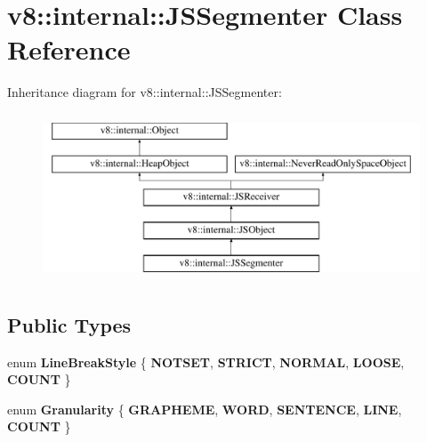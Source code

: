 \hypertarget{classv8_1_1internal_1_1JSSegmenter}{}\section{v8\+:\+:internal\+:\+:J\+S\+Segmenter Class Reference}
\label{classv8_1_1internal_1_1JSSegmenter}
Inheritance diagram for v8\+:\+:internal\+:\+:J\+S\+Segmenter\+:\begin{figure}[H]
\begin{center}
\leavevmode
\includegraphics[height=5.000000cm]{classv8_1_1internal_1_1JSSegmenter}
\end{center}
\end{figure}
\subsection*{Public Types}
\begin{DoxyCompactItemize}
\item 
\mbox{\label{classv8_1_1internal_1_1JSSegmenter_a627484dbc1e11dc02a9c9271137c63e9}} 
enum {\bfseries Line\+Break\+Style} \{ \newline
{\bfseries N\+O\+T\+S\+ET}, 
{\bfseries S\+T\+R\+I\+CT}, 
{\bfseries N\+O\+R\+M\+AL}, 
{\bfseries L\+O\+O\+SE}, 
\newline
{\bfseries C\+O\+U\+NT}
 \}
\item 
\mbox{\label{classv8_1_1internal_1_1JSSegmenter_a290b44bfddfb5408f5eb63f3b9a1f271}} 
enum {\bfseries Granularity} \{ \newline
{\bfseries G\+R\+A\+P\+H\+E\+ME}, 
{\bfseries W\+O\+RD}, 
{\bfseries S\+E\+N\+T\+E\+N\+CE}, 
{\bfseries L\+I\+NE}, 
\newline
{\bfseries C\+O\+U\+NT}
 \}
\end{DoxyCompactItemize}
